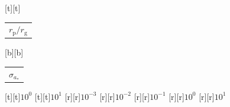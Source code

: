 %    
%
%
\begin{psfrags}%
\psfragscanon%
%
[t][t]{\color[rgb]{0,0,0}\setlength{\tabcolsep}{0pt}\begin{tabular}{c}{\Large$r_\mathrm{p}/r_\mathrm{g}$}\end{tabular}}%
[b][b]{\color[rgb]{0,0,0}\setlength{\tabcolsep}{0pt}\begin{tabular}{c}{\Large$\sigma_{a_\ast}$}\end{tabular}}%
%
[t][t]{$10^{0}$}%
[t][t]{$10^{1}$}%
%
[r][r]{$10^{-3}$}%
[r][r]{$10^{-2}$}%
[r][r]{$10^{-1}$}%
[r][r]{$10^{0}$}%
[r][r]{$10^{1}$}%
%
%
\end{psfrags}%
%
